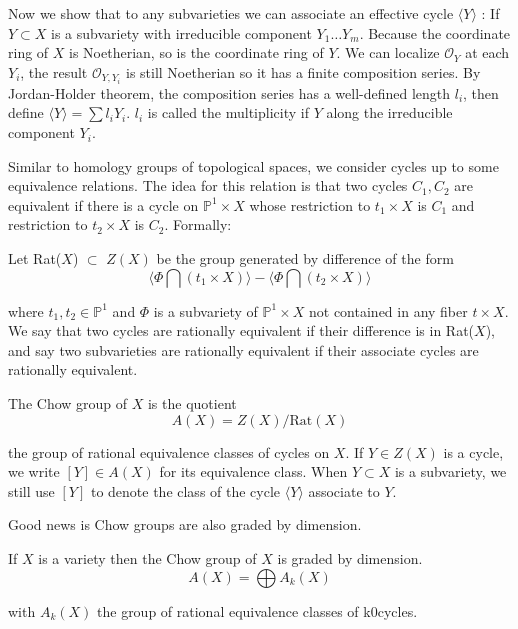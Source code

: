 \documentclass[12pt]{article}
\begin{document}
Now we show that to any subvarieties we can associate an effective cycle $\langle Y \rangle$ : If $Y \subset X $ is a subvariety with irreducible component $Y_{1}\dots Y_{m}$. Because the coordinate ring of $X$ is Noetherian, so is the coordinate ring of $Y$. We can localize $\mathcal{O}_{Y}$ at each $Y_{i}$, the result $\mathcal{O}_{Y,Y_{i}}$ is still Noetherian so it has a finite composition series. By Jordan-Holder theorem, the composition series has a well-defined length $l_{i}$, then define $\langle Y \rangle = \sum l_{i}Y_{i}$. $l_{i}$ is called the multiplicity if $Y$ along the irreducible component $Y_{i}$. 

Similar to homology groups of topological spaces, we consider cycles up to some equivalence relations. The idea for this relation is that two cycles $C_{1}, C_{2}$ are equivalent if there is a cycle on $\mathbb{P}^{1}\times X$ whose restriction to ${t_{1}} \times X$ is $C_{1}$ and restriction to ${t_{2}} \times X$ is $C_{2}$. Formally:

\begin{df}
    Let Rat($X$) $\subset$ $Z(X)$ be the group generated by difference of the form 
    \[ \langle \Phi \bigcap ({t_{1}} \times X) \rangle - \langle \Phi \bigcap ({t_{2}} \times X)\rangle \]

    where $t_{1},t_{2} \in \mathbb{P}^{1}$ and $\Phi$ is a subvariety of $\mathbb{P}^{1}\times X$ not contained in any fiber ${t} \times X$. We say that two cycles are rationally equivalent if their difference is in Rat($X$), and say two subvarieties are rationally equivalent if their associate cycles are rationally equivalent.
\end{df}

\begin{df}
    The Chow group of $X$ is the quotient 
    \[ A(X) = Z(X) / \text{Rat}(X)\]

the group of rational equivalence classes of cycles on $X$. If $Y \in Z(X) $ is a cycle, we write $[Y] \in A(X)$ for its equivalence class. When $Y \subset X $ is a subvariety, we still use $[Y]$ to denote the class of the cycle $\langle Y \rangle$ associate to $Y$.
\end{df}

Good news is Chow groups are also graded by dimension.

\begin{thm}
    If $X$ is a variety then the Chow group of $X$ is graded by dimension.
     \[ A(X) = \bigoplus A_{k}(X)\]

    with $A_{k}(X)$ the group of rational equivalence classes of k0cycles.
\end{thm}
\end{document}
